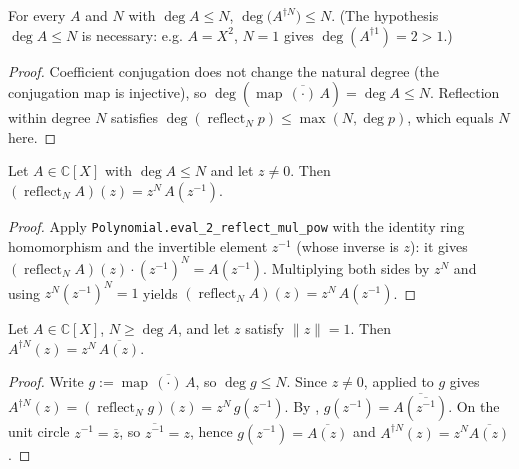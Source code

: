 \begin{lemma}
    \label{lem:conjrecip-natDegree}
    \leanok
    For every $A$ and $N$ with $\deg A \le N$, $\deg\bigl(A^{\dagger N}\bigr) \le N$.
    (The hypothesis $\deg A \le N$ is necessary: e.g. $A = X^2$, $N = 1$ gives
    $\deg(A^{\dagger 1}) = 2 > 1$.)
\end{lemma}
\begin{proof}
    Coefficient conjugation does not change the natural degree (the conjugation map
    is injective), so $\deg(\operatorname{map}\,\overline{(\cdot)}\,A) = \deg A \le N$.
    Reflection within degree $N$ satisfies
    $\deg(\operatorname{reflect}_N p) \le \max(N, \deg p)$, which equals $N$ here.
\end{proof}

\begin{lemma}
    \label{lem:reflect-eval}
    \leanok
    Let $A \in \mathbb{C}[X]$ with $\deg A \le N$ and let $z \neq 0$. Then
    $(\operatorname{reflect}_N A)(z) = z^{N}\,A(z^{-1})$.
\end{lemma}
\begin{proof}
    Apply \texttt{Polynomial.eval\_2\_reflect\_mul\_pow} with the identity ring
    homomorphism and the invertible element $z^{-1}$ (whose inverse is $z$): it
    gives $(\operatorname{reflect}_N A)(z)\cdot (z^{-1})^{N} = A(z^{-1})$.
    Multiplying both sides by $z^{N}$ and using $z^{N}(z^{-1})^{N} = 1$ yields
    $(\operatorname{reflect}_N A)(z) = z^{N}\,A(z^{-1})$.
\end{proof}

\begin{lemma}
    \label{lem:conj-recip-eval}
    \leanok
    Let $A \in \mathbb{C}[X]$, $N \ge \deg A$, and let $z$ satisfy $\|z\| = 1$.
    Then $A^{\dagger N}(z) = z^{N}\,\overline{A(z)}$.
\end{lemma}
\begin{proof}
    Write $g := \operatorname{map}\,\overline{(\cdot)}\,A$, so $\deg g \le N$.
    Since $z \neq 0$,  applied to $g$ gives
    $A^{\dagger N}(z) = (\operatorname{reflect}_N g)(z) = z^{N}\, g(z^{-1})$.
    By ,
    $g(z^{-1}) = \overline{A(\overline{z^{-1}})}$. On the unit circle
    $z^{-1} = \overline{z}$, so $\overline{z^{-1}} = z$, hence
    $g(z^{-1}) = \overline{A(z)}$ and $A^{\dagger N}(z) = z^{N}\overline{A(z)}$.
\end{proof}

